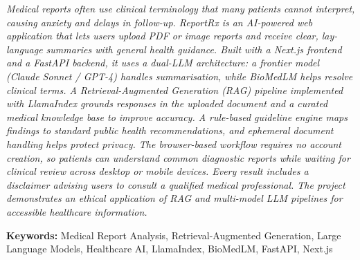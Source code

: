 \documentclass[12pt,a4paper]{report}
\newcommand{\abstracttextfont}{\fontsize{12pt}{14.4pt}\selectfont\itshape}
\begin{document}
\noindent\begin{minipage}{0.95\textwidth}
\justifying
\abstracttextfont
Medical reports often use clinical terminology that many patients cannot interpret, causing anxiety and delays in follow-up. ReportRx is an AI-powered web application that lets users upload PDF or image reports and receive clear, lay-language summaries with general health guidance. Built with a Next.js frontend and a FastAPI backend, it uses a dual-LLM architecture: a frontier model (Claude Sonnet / GPT-4) handles summarisation, while BioMedLM helps resolve clinical terms. A Retrieval-Augmented Generation (RAG) pipeline implemented with LlamaIndex grounds responses in the uploaded document and a curated medical knowledge base to improve accuracy. A rule-based guideline engine maps findings to standard public health recommendations, and ephemeral document handling helps protect privacy. The browser-based workflow requires no account creation, so patients can understand common diagnostic reports while waiting for clinical review across desktop or mobile devices. Every result includes a disclaimer advising users to consult a qualified medical professional. The project demonstrates an ethical application of RAG and multi-model LLM pipelines for accessible healthcare information.

\vspace{12pt}
\noindent\textbf{Keywords:} Medical Report Analysis, Retrieval-Augmented Generation, Large Language Models, Healthcare AI, LlamaIndex, BioMedLM, FastAPI, Next.js
\end{minipage}

\clearpage

\setcounter{page}{5}
\renewcommand{\contentsname}{TABLE OF CONTENTS}
\tableofcontents
{}
\clearpage

\renewcommand{\listtablename}{LIST OF TABLES}
\listoftables
{}
\clearpage

\renewcommand{\listfigurename}{LIST OF FIGURES}
\listoffigures
{}
\clearpage
\end{document}
